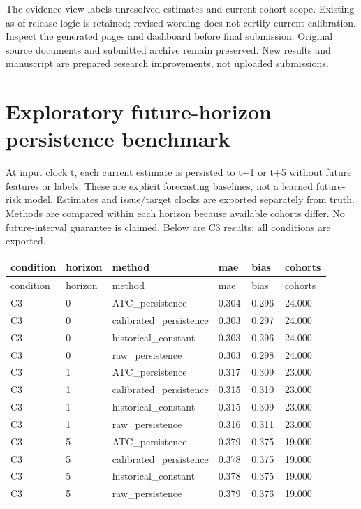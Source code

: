 \documentclass[11pt,a4paper]{article}
\begin{document}
The evidence view labels unresolved estimates and current-cohort scope. Existing as-of release logic is retained; revised wording does not certify current calibration. Inspect the generated pages and dashboard before final submission. Original source documents and submitted archive remain preserved. New results and manuscript are prepared research improvements, not uploaded submissions.\par


\section{Exploratory future-horizon persistence benchmark}

At input clock t, each current estimate is persisted to t+1 or t+5 without future features or labels. These are explicit forecasting baselines, not a learned future-risk model. Estimates and issue/target clocks are exported separately from truth. Methods are compared within each horizon because available cohorts differ. No future-interval guarantee is claimed. Below are C3 results; all conditions are exported.\par

\begingroup\scriptsize
\begin{longtable}{p{0.15166666666666667\linewidth}p{0.15166666666666667\linewidth}p{0.15166666666666667\linewidth}p{0.15166666666666667\linewidth}p{0.15166666666666667\linewidth}p{0.15166666666666667\linewidth}}
\toprule
condition & horizon & method & mae & bias & cohorts \\
\midrule
\endfirsthead
\toprule
condition & horizon & method & mae & bias & cohorts \\
\midrule
\endhead
C3 & 0 & ATC\_\allowbreak{}persistence & 0.304 & 0.296 & 24.000 \\
C3 & 0 & calibrated\_\allowbreak{}persistence & 0.303 & 0.297 & 24.000 \\
C3 & 0 & historical\_\allowbreak{}constant & 0.303 & 0.296 & 24.000 \\
C3 & 0 & raw\_\allowbreak{}persistence & 0.303 & 0.298 & 24.000 \\
C3 & 1 & ATC\_\allowbreak{}persistence & 0.317 & 0.309 & 23.000 \\
C3 & 1 & calibrated\_\allowbreak{}persistence & 0.315 & 0.310 & 23.000 \\
C3 & 1 & historical\_\allowbreak{}constant & 0.315 & 0.309 & 23.000 \\
C3 & 1 & raw\_\allowbreak{}persistence & 0.316 & 0.311 & 23.000 \\
C3 & 5 & ATC\_\allowbreak{}persistence & 0.379 & 0.375 & 19.000 \\
C3 & 5 & calibrated\_\allowbreak{}persistence & 0.378 & 0.375 & 19.000 \\
C3 & 5 & historical\_\allowbreak{}constant & 0.378 & 0.375 & 19.000 \\
C3 & 5 & raw\_\allowbreak{}persistence & 0.379 & 0.376 & 19.000 \\
\bottomrule
\end{longtable}
\endgroup
\end{document}
